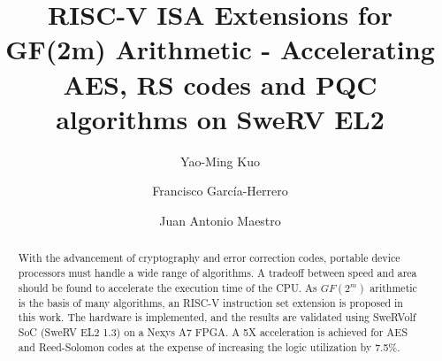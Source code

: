 \documentclass[sigconf]{acmart}
\begin{document}
\title{RISC-V ISA Extensions for GF(2m) Arithmetic - Accelerating AES, RS codes and PQC algorithms on SweRV EL2}

\author{Yao-Ming Kuo}
\author{Francisco García-Herrero}
\author{Juan Antonio Maestro}


\begin{abstract}
  With the advancement of cryptography and error correction codes, portable device processors 
  must handle a wide range of algorithms. A tradeoff between speed and area should be found to 
  accelerate the execution time of the CPU. As $GF(2^m)$ arithmetic is the basis of many algorithms, 
  an RISC-V instruction set extension is proposed in this work. The hardware is implemented, and the 
  results are validated using SweRVolf SoC (SweRV EL2 1.3) on a Nexys A7 FPGA. A 5X acceleration 
  is achieved for AES and Reed-Solomon codes at the expense of increasing the logic utilization by 7.5\%.
\end{abstract}

\end{document}
